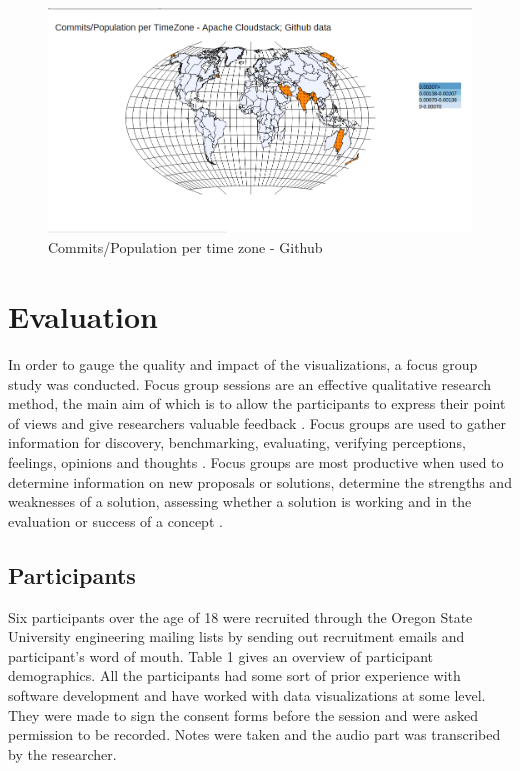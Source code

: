 \documentclass[double,12pt]{beavtex}
\begin{document}
\begin{figure}[H]
\centering
\includegraphics[width=130mm,height=60mm]{image10.png}
\caption{Commits/Population per time zone - Github}
\label{fig:div3}
\end{figure}

\chapter{Evaluation}
In order to gauge the quality and impact of the visualizations, a focus group study was conducted. Focus group sessions are an effective qualitative research method, the main aim of which is to allow the participants to express their point of views and give researchers valuable feedback \cite{villard}.  Focus groups are used to gather information for discovery, benchmarking, evaluating, verifying perceptions, feelings, opinions and thoughts \cite{patton1990}. Focus groups are most productive when used to determine information on new proposals or solutions, determine the strengths and weaknesses of a solution, assessing whether a solution is working and in the evaluation or success of a concept \cite{greenbaum1993}.

\section{Participants}
Six participants over the age of 18 were recruited through the Oregon State University engineering mailing lists by sending out recruitment emails and participant's word of mouth. Table 1 gives an overview of participant demographics. All the participants had some sort of prior experience with software development and have worked with data visualizations at some level. They were made to sign the consent forms before the session and were asked permission to be recorded. Notes were taken and the audio part was transcribed by the researcher.
\end{document}
